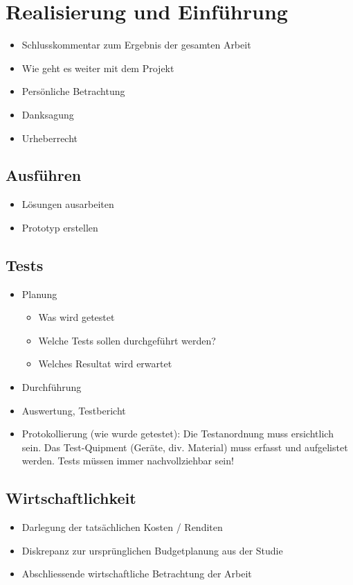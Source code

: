 \section{Realisierung und Einführung} 
\label{sec:RealisierungEinfuehrung}

\begin{itemize}
	\item Schlusskommentar zum Ergebnis der gesamten Arbeit
	\item Wie geht es weiter mit dem Projekt
	\item Persönliche Betrachtung
	\item Danksagung
	\item Urheberrecht
\end{itemize}

\subsection{Ausführen}
\begin{itemize}
	\item Lösungen ausarbeiten
	\item Prototyp erstellen
\end{itemize}

\subsection{Tests}
\begin{itemize}
	\item Planung
	\begin{itemize}
		\item Was wird getestet
		\item Welche Tests sollen durchgeführt werden?
		\item Welches Resultat wird erwartet
	\end{itemize}
	\item Durchführung
	\item Auswertung, Testbericht
	\item Protokollierung (wie wurde getestet): Die Testanordnung muss ersichtlich sein.
	Das Test-Quipment (Geräte, div. Material) muss erfasst und aufgelistet werden.
	Tests müssen immer nachvollziehbar sein!
\end{itemize}


\subsection{Wirtschaftlichkeit}
\begin{itemize}
	\item Darlegung der tatsächlichen Kosten / Renditen
	\item Diskrepanz zur ursprünglichen Budgetplanung aus der Studie
	\item Abschliessende wirtschaftliche Betrachtung der Arbeit
\end{itemize}

